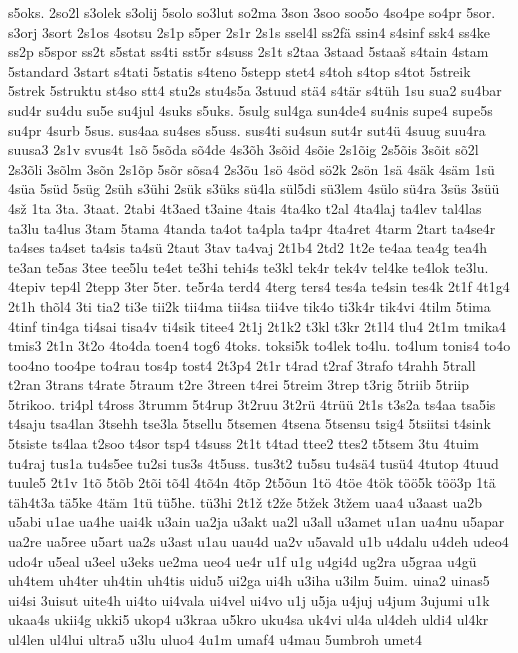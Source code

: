 {s5oks.
2so2l
s3olek
s3olij
5solo
so3lut
so2ma
3son
3soo
soo5o
4so4pe
so4pr
5sor.
s3orj
3sort
2s1os
4sotsu
2s1p
s5per
2s1r
2s1s
ssel4l
ss2fä
ssin4
s4sinf
ssk4
ss4ke
ss2p
s5spor
ss2t
s5stat
ss4ti
sst5r
s4suss
2s1t
s2taa
3staad
5staaš
s4tain
4stam
5standard
3start
s4tati
5statis
s4teno
5stepp
stet4
s4toh
s4top
s4tot
5streik
5strek
5struktu
st4so
stt4
stu2s
stu4s5a
3stuud
stä4
s4tär
s4tüh
1su
sua2
su4bar
sud4r
su4du
su5e
su4jul
4suks
s5uks.
5sulg
sul4ga
sun4de4
su4nis
supe4
supe5s
su4pr
4surb
5sus.
sus4aa
su4ses
s5uss.
sus4ti
su4sun
sut4r
sut4ü
4suug
suu4ra
suusa3
2s1v
svus4t
1sõ
5sõda
sõ4de
4s3õh
3sõid
4sõie
2s1õig
2s5õis
3sõit
sõ2l
2s3õli
3sõlm
3sõn
2s1õp
5sõr
sõsa4
2s3õu
1sö
4söd
sö2k
2sön
1sä
4säk
4säm
1sü
4süa
5süd
5süg
2süh
s3ühi
2sük
s3üks
sü4la
sül5di
sü3lem
4sülo
sü4ra
3süs
3süü
4sž
1ta
3ta.
3taat.
2tabi
4t3aed
t3aine
4tais
4ta4ko
t2al
4ta4laj
ta4lev
tal4las
ta3lu
ta4lus
3tam
5tama
4tanda
ta4ot
ta4pla
ta4pr
4ta4ret
4tarm
2tart
ta4se4r
ta4ses
ta4set
ta4sis
ta4sü
2taut
3tav
ta4vaj
2t1b4
2td2
1t2e
te4aa
tea4g
tea4h
te3an
te5as
3tee
tee5lu
te4et
te3hi
tehi4s
te3kl
tek4r
tek4v
tel4ke
te4lok
te3lu.
4tepiv
tep4l
2tepp
3ter
5ter.
te5r4a
terd4
4terg
ters4
tes4a
te4sin
tes4k
2t1f
4t1g4
2t1h
thõl4
3ti
tia2
ti3e
tii2k
tii4ma
tii4sa
tii4ve
tik4o
ti3k4r
tik4vi
4tilm
5tima
4tinf
tin4ga
ti4sai
tisa4v
ti4sik
titee4
2t1j
2t1k2
t3kl
t3kr
2t1l4
tlu4
2t1m
tmika4
tmis3
2t1n
3t2o
4to4da
toen4
tog6
4toks.
toksi5k
to4lek
to4lu.
to4lum
tonis4
to4o
too4no
too4pe
to4rau
tos4p
tost4
2t3p4
2t1r
t4rad
t2raf
3trafo
t4rahh
5trall
t2ran
3trans
t4rate
5traum
t2re
3treen
t4rei
5treim
3trep
t3rig
5triib
5triip
5trikoo.
tri4pl
t4ross
3trumm
5t4rup
3t2ruu
3t2rü
4trüü
2t1s
t3s2a
ts4aa
tsa5is
t4saju
tsa4lan
3tsehh
tse3la
5tsellu
5tsemen
4tsena
5tsensu
tsig4
5tsiitsi
t4sink
5tsiste
ts4laa
t2soo
t4sor
tsp4
t4suss
2t1t
t4tad
ttee2
ttes2
t5tsem
3tu
4tuim
tu4raj
tus1a
tu4s5ee
tu2si
tus3s
4t5uss.
tus3t2
tu5su
tu4sä4
tusü4
4tutop
4tuud
tuule5
2t1v
1tõ
5tõb
2tõi
tõ4l
4tõ4n
4tõp
2t5õun
1tö
4töe
4tök
töö5k
töö3p
1tä
täh4t3a
tä5ke
4täm
1tü
tü5he.
tü3hi
2t1ž
t2že
5tžek
3tžem
uaa4
u3aast
ua2b
u5abi
u1ae
ua4he
uai4k
u3ain
ua2ja
u3akt
ua2l
u3all
u3amet
u1an
ua4nu
u5apar
ua2re
ua5ree
u5art
ua2s
u3ast
u1au
uau4d
ua2v
u5avald
u1b
u4dalu
u4deh
udeo4
udo4r
u5eal
u3eel
u3eks
ue2ma
ueo4
ue4r
u1f
u1g
u4gi4d
ug2ra
u5graa
u4gü
uh4tem
uh4ter
uh4tin
uh4tis
uidu5
ui2ga
ui4h
u3iha
u3ilm
5uim.
uina2
uinas5
ui4si
3uisut
uite4h
ui4to
ui4vala
ui4vel
ui4vo
u1j
u5ja
u4juj
u4jum
3ujumi
u1k
ukaa4s
ukii4g
ukki5
ukop4
u3kraa
u5kro
uku4sa
uk4vi
ul4a
ul4deh
uldi4
ul4kr
ul4len
ul4lui
ultra5
u3lu
uluo4
4u1m
umaf4
u4mau
5umbroh
umet4
}
